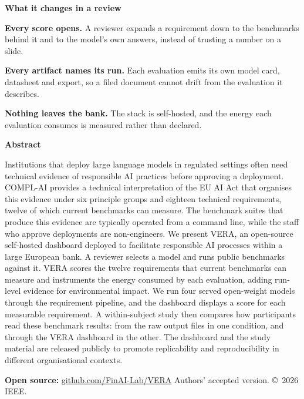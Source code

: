 \documentclass[11pt]{article}
\newcommand{\point}[2]{%
  \begin{minipage}[t]{0.028\textwidth}\raisebox{0.15ex}{\textcolor{brandgreen}{\rule{1.6mm}{1.6mm}}}\end{minipage}%
  \begin{minipage}[t]{0.96\textwidth}\textbf{#1} #2\end{minipage}\par\smallskip}
\begin{document}
\vspace{4mm}

{\color{inkblue}\large\textbf{What it changes in a review}\par}
\vspace{3mm}
\point{Every score opens.}{A reviewer expands a requirement down to the benchmarks behind it and to the model's own answers, instead of trusting a number on a slide.}
\point{Every artifact names its run.}{Each evaluation emits its own model card, datasheet and export, so a filed document cannot drift from the evaluation it describes.}
\point{Nothing leaves the bank.}{The stack is self-hosted, and the energy each evaluation consumes is measured rather than declared.}

\vspace{3mm}

\noindent\colorbox{softgrey}{%
  \begin{minipage}{\dimexpr\textwidth-2\fboxsep\relax}
    \vspace{3mm}
    {\color{inkblue}\textbf{Abstract}}\\[2mm]
    {\scriptsize Institutions that deploy large language models in regulated settings often need
    technical evidence of responsible AI practices before approving a deployment. COMPL-AI provides a
    technical interpretation of the EU AI Act that organises this evidence under six principle groups
    and eighteen technical requirements, twelve of which current benchmarks can measure. The benchmark
    suites that produce this evidence are typically operated from a command line, while the staff who
    approve deployments are non-engineers. We present VERA, an open-source self-hosted dashboard
    deployed to facilitate responsible AI processes within a large European bank. A reviewer selects a
    model and runs public benchmarks against it. VERA scores the twelve requirements that current
    benchmarks can measure and instruments the energy consumed by each evaluation, adding run-level
    evidence for environmental impact. We run four served open-weight models through the requirement
    pipeline, and the dashboard displays a score for each measurable requirement. A within-subject
    study then compares how participants read these benchmark results: from the raw output files in
    one condition, and through the VERA dashboard in the other. The dashboard and the study material
    are released publicly to promote replicability and reproducibility in different organisational
    contexts.\par}
    \vspace{3mm}
  \end{minipage}}

\vfill

{\color{black!55}\footnotesize
\textbf{Open source:} \href{https://github.com/FinAI-Lab/VERA}{github.com/FinAI-Lab/VERA}
\hfill Authors' accepted version. \copyright~2026 IEEE.\par}
\end{document}
